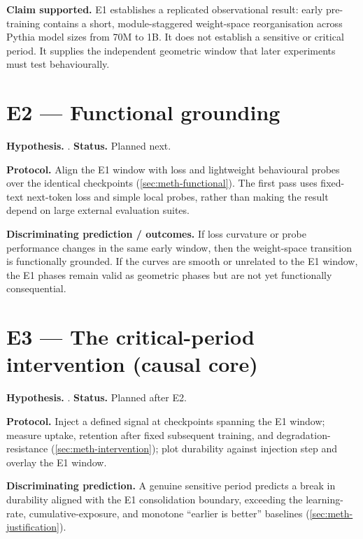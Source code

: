 \noindent\textbf{Claim supported.} E1 establishes a replicated observational result: early
pre-training contains a short, module-staggered weight-space reorganisation across Pythia model
sizes from 70M to 1B. It does not establish a sensitive or critical period. It supplies the
independent geometric window that later experiments must test behaviourally.

\section{E2 --- Functional grounding}
\label{sec:res-e2}

\noindent\textbf{Hypothesis.} . \quad\textbf{Status.} Planned next.

\noindent\textbf{Protocol.} Align the E1 window with loss and lightweight behavioural probes over
the identical checkpoints (\cref{sec:meth-functional}). The first pass uses fixed-text next-token
loss and simple local probes, rather than making the result depend on large external evaluation
suites.

\noindent\textbf{Discriminating prediction / outcomes.} If loss curvature or probe performance
changes in the same early window, then the weight-space transition is functionally grounded. If the
curves are smooth or unrelated to the E1 window, the E1 phases remain valid as geometric phases but
are not yet functionally consequential.


\section{E3 --- The critical-period intervention (causal core)}
\label{sec:res-e3}

\noindent\textbf{Hypothesis.} . \quad\textbf{Status.} Planned after E2.

\noindent\textbf{Protocol.} Inject a defined signal at checkpoints spanning the E1 window; measure
uptake, retention after fixed subsequent training, and degradation-resistance
(\cref{sec:meth-intervention}); plot durability against injection step and overlay the E1 window.

\noindent\textbf{Discriminating prediction.} A genuine sensitive period predicts a break in
durability aligned with the E1 consolidation boundary, exceeding the learning-rate,
cumulative-exposure, and monotone ``earlier is better'' baselines (\cref{sec:meth-justification}).

